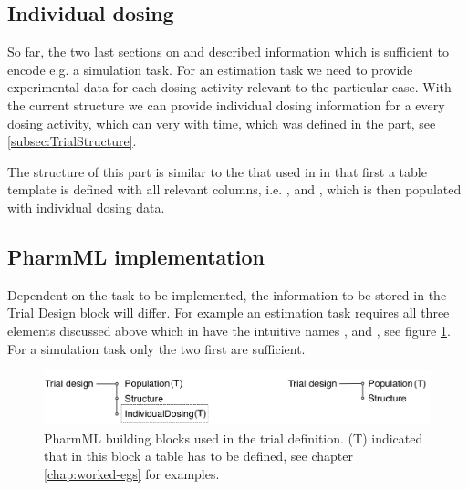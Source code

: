 %
%
% 

\subsection{Individual dosing}
\label{subsec:TrialSIndivDosing}

So far, the two last sections on  and  described information
which is sufficient to encode e.g. a simulation task. For an estimation task we need to provide 
experimental data for each dosing activity relevant to the particular case. 
With the current structure we can provide individual dosing information for a every dosing activity,
which can very with time, which was defined in the  part, see \ref{subsec:TrialStructure}.

The structure of this part is similar to the that used in  in that first 
a table template is defined with all relevant columns, i.e. ,  and ,
which is then populated with individual dosing data.


\subsection{PharmML implementation}
\label{subsec:TrialSIndivDosing}

Dependent on the task to be implemented, the information to be stored 
in the Trial Design block will differ. For example an estimation task requires all three 
elements discussed above which in \pharmml have the intuitive names
,  and , 
see figure \ref{fig:simEstTasks_trialList}. For a simulation task only the two first are 
sufficient.

  \begin{figure}[htb]
 \centering
 \includegraphics[width=0.7\linewidth]{pics/simEstTasks_trialList}%
 \caption{PharmML building blocks used in the trial definition. (T) indicated that in this
 block a table has to be defined, see chapter \ref{chap:worked-egs} for examples.}
 \label{fig:simEstTasks_trialList}
 \end{figure}




